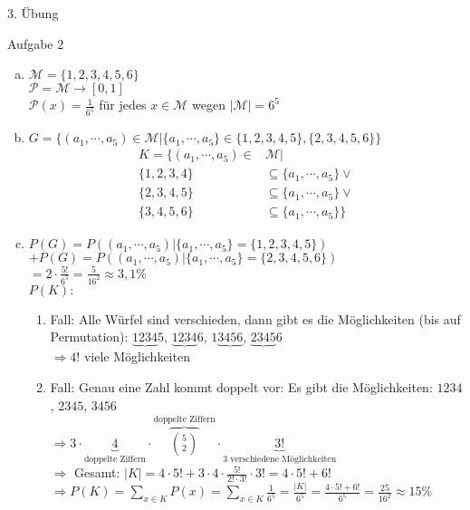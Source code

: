 \begin{section}{3. Übung}
 \begin{subsection}{Aufgabe 2}
 \begin{enumerate}[a)]
  \item $\mathcal{M} = \{1,2,3,4,5,6\}$\\
  $\mathcal{P} = \mathcal{M} \rightarrow [0,1]$\\
  $\mathcal{P}(x) = \frac{1}{6^5}$ für jedes $x \in \mathcal{M}$ wegen $|\mathcal{M}| = 6^5$
  \item $G = \{(a_1, \cdots, a_5)\in \mathcal{M}|\{a_1, \cdots, a_5\}\in\{1,2,3,4,5\},\{2,3,4,5,6\}\}$\\
  \begin{align*}
   K = \{(a_1, \cdots, a_5) \in & \mathcal{M}| \\
   \{1,2,3,4\} & \subseteq \{a_1, \cdots, a_5\} \vee \\
   \{2,3,4,5\} & \subseteq \{a_1, \cdots, a_5\} \vee \\
   \{3,4,5,6\} & \subseteq \{a_1, \cdots, a_5\} \}
  \end{align*}
  \item $P(G) = P((a_1, \cdots, a_5)|\{a_1, \cdots, a_5\} = \{1,2,3,4,5\})$ \\
  $+ P(G) = P((a_1, \cdots, a_5)|\{a_1, \cdots, a_5\} = \{2,3,4,5,6\})$ \\
  $= 2 \cdot \frac{5!}{6^5}  =\frac{5}{16^2} \approx 3,1\%$\\
  $P(K):$
  \begin{enumerate} [1.]
   \item Fall: Alle Würfel sind verschieden, dann gibt es die Möglichkeiten (bis auf Permutation): $\underbrace{1234}5$, $\underbrace{1234}6$, $1\underbrace{3456}$, $\underbrace{2345}6$\\
   $\Rightarrow 4!$ viele Möglichkeiten
   \item Fall: Genau eine Zahl kommt doppelt vor: Es gibt die Möglichkeiten: $1234$, $2345$, $3456$\\
   $\Rightarrow 3 \cdot \underbrace{4}_{\text{doppelte Ziffern}} \cdot \overbrace{\binom{5}{2}}^{\text{doppelte Ziffern}} \cdot\underbrace{3!}_{\text{3 verschiedene Möglichkeiten}}$\\
   $\Rightarrow$ Gesamt: $|K| = 4 \cdot 5! + 3 \cdot 4 \cdot \frac{5!}{2!\cdot3!}\cdot 3! = 4\cdot 5! + 6!$ \\
   $\Rightarrow P(K) = \sum_{x \in K} P(x) = \sum_{x \in K} \frac{1}{6^5} = \frac{|K|}{6^5} = \frac{4 \cdot 5! + 6!}{6^5}  =\frac{25}{16^2} \approx 15\%$
  \end{enumerate}

 \end{enumerate}

  
 \end{subsection}

 
\end{section}
